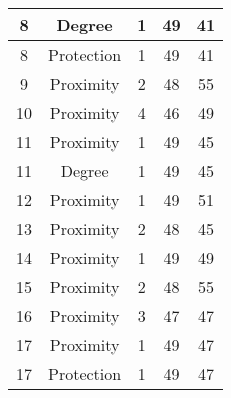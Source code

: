 \documentclass[results.tex]{subfiles}
\begin{document}
\begin{center}
\begin{tabular}{| c || c | c | c | c |}
            \hline
            8                       & Degree                       & 1                      & 49                      & 41                   \\
            \hline
            8                       & Protection                   & 1                      & 49                      & 41                   \\
            \hline
            9                       & Proximity                    & 2                      & 48                      & 55                   \\
            \hline
            10                      & Proximity                    & 4                      & 46                      & 49                   \\
            \hline
            11                      & Proximity                    & 1                      & 49                      & 45                   \\
            \hline
            11                      & Degree                       & 1                      & 49                      & 45                   \\
            \hline
            12                      & Proximity                    & 1                      & 49                      & 51                   \\
            \hline
            13                      & Proximity                    & 2                      & 48                      & 45                   \\
            \hline
            14                      & Proximity                    & 1                      & 49                      & 49                   \\
            \hline
            15                      & Proximity                    & 2                      & 48                      & 55                   \\
            \hline
            16                      & Proximity                    & 3                      & 47                      & 47                   \\
            \hline
            17                      & Proximity                    & 1                      & 49                      & 47                   \\
            \hline
            17                      & Protection                   & 1                      & 49                      & 47                   \\

\end{tabular}
\end{center}
\end{document}
